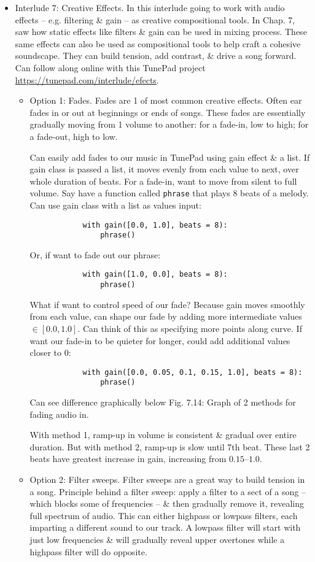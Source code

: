 \documentclass{article}
\begin{document}
\begin{itemize}
\begin{itemize}
	\end{itemize}
	\item {\sf Interlude 7: Creative Effects.} In this interlude going to work with audio effects -- e.g. filtering \& gain -- as creative compositional tools. In Chap. 7, saw how static effects like filters \& gain can be used in mixing process. These same effects can also be used as compositional tools to help craft a cohesive soundscape. They can build tension, add contrast, \& drive a song forward. Can follow along online with this TunePad project \url{https://tunepad.com/interlude/efects}.
	\begin{itemize}
		\item {\sf Option 1: Fades.} Fades are 1 of most common creative effects. Often ear fades in or out at beginnings or ends of songs. These fades are essentially gradually moving from 1 volume to another: for a fade-in, low to high; for a fade-out, high to low.
		
		Can easily add fades to our music in TunePad using gain effect \& a list. If gain class is passed a list, it moves evenly from each value to next, over whole duration of beats. For a fade-in, want to move from silent to full volume. Say have a function called {\tt phrase} that plays 8 beats of a melody. Can use gain class with a list as values input:
		\begin{verbatim}
			with gain([0.0, 1.0], beats = 8):
			    phrase()
		\end{verbatim}
		Or, if want to fade out our phrase:
		\begin{verbatim}
			with gain([1.0, 0.0], beats = 8):
			    phrase()
		\end{verbatim}
		What if want to control speed of our fade? Because gain moves smoothly from each value, can shape our fade by adding more intermediate values $\in[0.0,1.0]$. Can think of this as specifying more points along curve. If want our fade-in to be quieter for longer, could add additional values closer to 0:
		\begin{verbatim}
			with gain([0.0, 0.05, 0.1, 0.15, 1.0], beats = 8):
			    phrase()
		\end{verbatim}
		Can see difference graphically below {\sf Fig. 7.14: Graph of 2 methods for fading audio in.}
		
		With method 1, ramp-up in volume is consistent \& gradual over entire duration. But with method 2, ramp-up is slow until 7th beat. These last 2 beats have greatest increase in gain, increasing from $0.15$--$1.0$.
		\item {\sf Option 2: Filter sweeps.} Filter sweeps are a great way to build tension in a song. Principle behind a filter sweep: apply a filter to a sect of a song -- which blocks some of frequencies -- \& then gradually remove it, revealing full spectrum of audio. This can either highpass or lowpass filters, each imparting a different sound to our track. A lowpass filter will start with just low frequencies \& will gradually reveal upper overtones while a highpass filter will do opposite.
		

\end{itemize}
\end{itemize}
\end{document}
